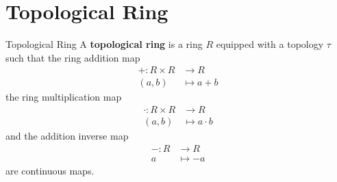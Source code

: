 \section{Topological Ring}
\begin{definition}{Topological Ring}{}
    A \textbf{topological ring} is a ring $R$ equipped with a topology $\tau$ such that the ring addition map
    \begin{align*}
        +:R\times R&\longrightarrow R\\
        (a,b)&\longmapsto a+b
    \end{align*}
    the ring multiplication map
    \begin{align*}
        \cdot:R\times R&\longrightarrow R\\
        (a,b)&\longmapsto a\cdot b
    \end{align*}
    and the addition inverse map
    \begin{align*}
        -:R&\longrightarrow R\\
        a&\longmapsto -a
    \end{align*}
    are continuous maps.
\end{definition}

